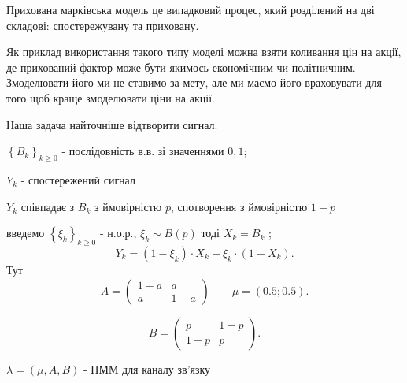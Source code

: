 Прихована марківська модель це випадковий процес, який розділений на дві складові:
спостережувану та приховану.


Як приклад використання такого типу моделі можна взяти коливання цін на акції, де
прихований фактор може бути якимось економічним чи політничним. Змоделювати його
ми не ставимо за мету, але ми маємо його враховувати для того щоб краще змоделювати ціни
на акції.

\begin{example}
Наша задача найточніше відтворити сигнал.

$\left\{ B_k \right\}_{k \geq 0}$ - послідовність в.в. зі значеннями $0,1$;

 $Y_k$ - спостережений сигнал

  $Y_k$ співпадає з $B_k$ з ймовірністю $p$, спотворення з ймовірністю $1-p$ 

введемо $\left\{ \xi_k \right\}_{k\geq 0}$ - н.о.р., $\xi_k \sim B(p)$
тоді $X_k = B_k$ ;
\[
Y_k = \left( 1-\xi_k \right) \cdot X_k + \xi_k \cdot \left( 1 - X_k \right)
.\] 
Тут \[
A = \begin{pmatrix}
  1 - a & a \\
  a & 1 - a
\end{pmatrix} \qquad \mu = \left( 0.5; 0.5 \right) 
.\] 

\[
B = \begin{pmatrix}
  p & 1-p \\
  1-p & p
\end{pmatrix} 
.\] 

$\lambda = \left( \mu, A, B \right)$ - ПММ для каналу зв'язку
\end{example}


